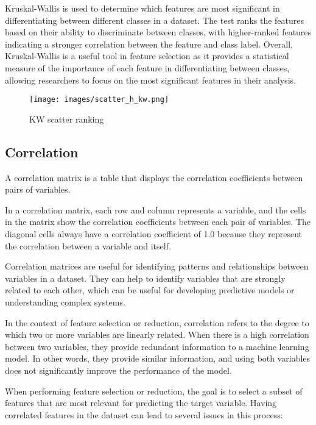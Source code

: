 \documentclass[12pt, a4paper]{article}
\begin{document}
Kruskal-Wallis is used to determine which features are most significant in differentiating between different classes in a dataset. The test ranks the features based on their ability to discriminate between classes, with higher-ranked features indicating a stronger correlation between the feature and class label. Overall, Kruskal-Wallis is a useful tool in feature selection as it provides a statistical measure of the importance of each feature in differentiating between classes, allowing researchers to focus on the most significant features in their analysis.

\begin{figure}[H]
\centering
\texttt{[image: images/scatter\_h\_kw.png]}
\caption{KW scatter ranking}
\label{fig:myimage}
\end{figure}

\subsection{Correlation}

A correlation matrix is a table that displays the correlation coefficients between pairs of variables. 

In a correlation matrix, each row and column represents a variable, and the cells in the matrix show the correlation coefficients between each pair of variables. The diagonal cells always have a correlation coefficient of 1.0 because they represent the correlation between a variable and itself.

Correlation matrices are useful for identifying patterns and relationships between variables in a dataset. They can help to identify variables that are strongly related to each other, which can be useful for developing predictive models or understanding complex systems.

In the context of feature selection or reduction, correlation refers to the degree to which two or more variables are linearly related. When there is a high correlation between two variables, they provide redundant information to a machine learning model. In other words, they provide similar information, and using both variables does not significantly improve the performance of the model.

When performing feature selection or reduction, the goal is to select a subset of features that are most relevant for predicting the target variable. Having correlated features in the dataset can lead to several issues in this process:
\end{document}
